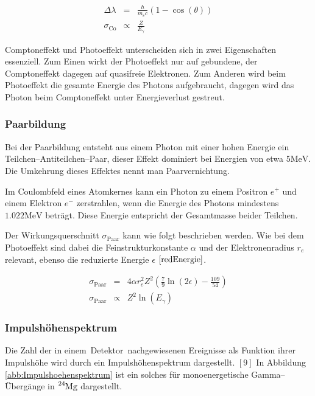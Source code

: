 \documentclass[12pt,a4paper]{scrartcl}
\numberwithin{equation}{section} %
\newcommand{\pu}[1]{\ensuremath{\mathrm{#1}}}
\begin{document}
\begin{eqnarray}
    \Delta \lambda &=& \frac{h}{m_e c} (1 - \cos(\theta)) \\
    \sigma_\mathrm{Co} &\propto & \frac{Z}{E_\gamma}
\end{eqnarray}

\noindent
Comptoneffekt und Photoeffekt unterscheiden sich in zwei Eigenschaften essenziell. Zum Einen wirkt der Photoeffekt nur auf gebundene, der Comptoneffekt dagegen auf quasifreie Elektronen. Zum Anderen wird beim Photoeffekt die gesamte Energie des Photons aufgebraucht, dagegen wird das Photon beim Comptoneffekt unter Energieverlust gestreut.

\hypertarget{paarbildung}{%
\subsubsection{Paarbildung}\label{paarbildung}}

Bei der Paarbildung entsteht aus einem Photon mit einer hohen Energie ein Teilchen--Antiteilchen--Paar, dieser Effekt dominiert bei Energien von etwa $\pu{5 MeV}$. Die Umkehrung dieses Effektes nennt man Paarvernichtung.

Im Coulombfeld eines Atomkernes kann ein Photon zu einem Positron $e^+$ und einem Elektron $e^-$ zerstrahlen, wenn die Energie des Photons mindestens $\pu{1.022 MeV}$ beträgt. Diese Energie entspricht der Gesamtmasse beider Teilchen.

Der Wirkungsquerschnitt $\sigma_\mathrm{Paar}$ kann wie folgt beschrieben werden. Wie bei dem Photoeffekt sind dabei die Feinstrukturkonstante $\alpha$ und der Elektronenradius $r_e$ relevant, ebenso die reduzierte Energie $\epsilon$ $\eqref{redEnergie}$.

\begin{eqnarray}
    \sigma_\mathrm{Paar}
        &=& 4\alpha r_e^2 Z^2
            \left(\frac{7}{9} \ln(2\epsilon) - \frac{109}{54} \right) \\
    \sigma_\mathrm{Paar}
        &\propto& Z^2 \ln(E_\gamma)
\end{eqnarray}

\hypertarget{impulshuxf6henspektrum}{%
\subsubsection{Impulshöhenspektrum}\label{impulshuxf6henspektrum}}

Die Zahl der in einem~Detektor~nachgewiesenen Ereignisse als Funktion ihrer Impulshöhe wird durch ein Impulshöhenspektrum dargestellt. $[9]$ In Abbildung \ref{abb:Impulshoehenspektrum} ist ein solches für monoenergetische Gamma--Übergänge in $\ce{^{24}Mg}$ dargestellt.
\end{document}
